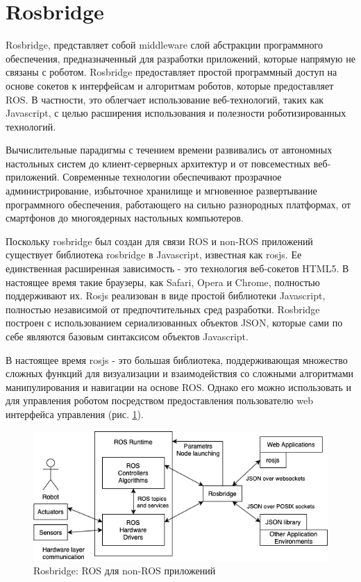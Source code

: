 \section{Rosbridge}

Rosbridge, представляет собой middleware слой абстракции программного обеспечения, предназначенный для разработки приложений, которые напрямую не связаны с роботом. Rosbridge предоставляет простой программный доступ на основе сокетов к интерфейсам и алгоритмам роботов, которые предоставляет ROS. В частности, это облегчает использование веб-технологий, таких как Javascript, с целью расширения использования и полезности роботизированных технологий.

Вычислительные парадигмы с течением времени развивались от автономных настольных систем до клиент-серверных архитектур и от повсеместных веб-приложений. Современные технологии обеспечивают прозрачное администрирование, избыточное хранилище и мгновенное развертывание программного обеспечения, работающего на сильно разнородных платформах, от смартфонов до многоядерных настольных компьютеров.

Поскольку rosbridge был создан для связи ROS и non-ROS приложений существует библиотека rosbridge в Javascript, известная как rosjs. Ее единственная расширенная зависимость - это технология веб-сокетов HTML5. В настоящее время такие браузеры, как Safari, Opera и Chrome, полностью поддерживают их. Rosjs реализован в виде простой библиотеки Javascript, полностью независимой от предпочтительных сред разработки. Rosbridge построен с использованием сериализованных объектов JSON, которые сами по себе являются базовым синтаксисом объектов Javascript.

В настоящее время rosjs - это большая библиотека, поддерживающая множество сложных функций для визуализации и взаимодействия со сложными алгоритмами манипулирования и навигации на основе ROS. Однако его можно использовать и для управления роботом посредством предоставления пользователю web интерфейса управления (рис. \ref{img:rosbridge}).

\begin{figure}[h!]
	\centering
	\includegraphics[width = \linewidth]{img/rosbridge}
	\caption{Rosbridge: ROS для non-ROS приложений}
	\label{img:rosbridge}
\end{figure}

